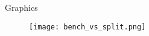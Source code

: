 \documentclass{beamer}
\begin{document}

\begin{frame}{Graphics}
	\begin{figure}
	\texttt{[image: bench\_vs\_split.png]}
	\end{figure}

\end{frame}
\end{document}
